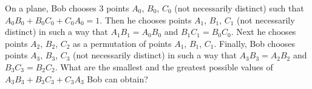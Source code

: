 On a plane, Bob chooses 3 points $A_0$, $B_0$, $C_0$ (not necessarily distinct) such that $A_0B_0+B_0C_0+C_0A_0=1$. Then he chooses points $A_1$, $B_1$, $C_1$ (not necessarily distinct) in such a way that $A_1B_1=A_0B_0$ and $B_1C_1=B_0C_0$.
Next he chooses points $A_2$, $B_2$, $C_2$ as a permutation of points $A_1$, $B_1$, $C_1$. Finally, Bob chooses points $A_3$, $B_3$, $C_3$ (not necessarily distinct) in such a way that $A_3B_3=A_2B_2$ and $B_3C_3=B_2C_2$. What are the smallest and the greatest possible values of $A_3B_3+B_3C_3+C_3A_3$ Bob can obtain?